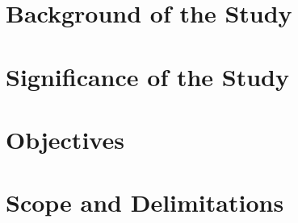 \section{Background of the Study}

\section{Significance of the Study}

\section{Objectives}

\section{Scope and Delimitations}
